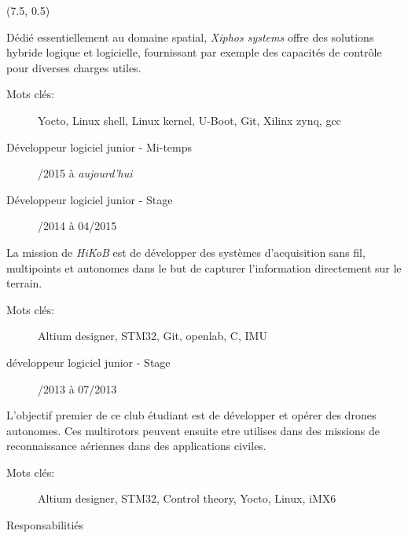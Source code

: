 	\begin{textblock}{13.5}(7.5, 0.5)

		D\'edi\'e essentiellement au domaine spatial, {\em Xiphos systems}
		offre des solutions hybride logique et logicielle, fournissant par exemple
		des capacit\'es de contr\^ole pour diverses charges utiles.

		\begin{description}
			\item[Mots cl\'es:] Yocto, Linux shell, Linux kernel, U-Boot, Git, Xilinx zynq, gcc
			\item[D\'eveloppeur logiciel junior - Mi-temps] /2015 \`a \emph{aujourd'hui}
			\item[D\'eveloppeur logiciel junior - Stage] /2014 \`a 04/2015
		\end{description}

		La mission de {\em HiKoB} est de d\'evelopper des syst\`emes d'acquisition
		sans fil, multipoints et autonomes dans le but de capturer l'information
		directement sur le terrain.

		\begin{description}
			\item[Mots cl\'es:] Altium designer, STM32, Git, openlab, C, IMU
			\item[d\'eveloppeur logiciel junior - Stage] /2013 \`a 07/2013
		\end{description}


		L'objectif premier de ce club \'etudiant est de d\'evelopper et op\'erer
		des drones autonomes. Ces multirotors peuvent ensuite etre utilises dans
		des missions de reconnaissance a\'eriennes dans des applications civiles.

		\begin{description}
			\item[Mots cl\'es:] Altium designer, STM32, Control theory, Yocto, Linux, iMX6
			\item[Responsabiliti\'es] \hfill
		\end{description}


\end{textblock}
